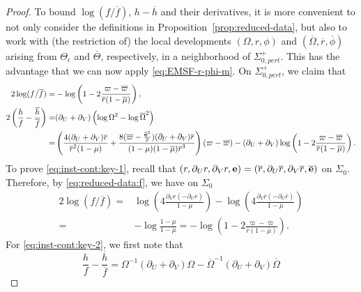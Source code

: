 \documentclass[10pt, reqno]{amsart}
\theoremstyle{definition}
\theoremstyle{remark}
\theoremstyle{conjecture}
\numberwithin{equation}{section}
\newcommand{\rd}{\partial}
\newcommand{\0}{\emptyset}
\newcommand{\eps}{\epsilon}
\newcommand{\Sgm}{\Sigma}
\newcommand{\Tht}{\Theta}
\newcommand{\Omg}{\Omega}
\newcommand{\bfe}{{\bf e}}
\newcommand{\f}{\frac}
\newcommand{\e}{\bfe}							%
\newcommand{\Omgbg}{\overline{\Omg}}				%
\newcommand{\phibg}{\overline{\phi}}				%
\newcommand{\rbg}{\overline{r}}					%
\newcommand{\varpibg}{\overline{\varpi}}				%
\newcommand{\mubg}{\overline{\mu}}				%
\newcommand{\ebg}{\overline{\e}}					%
\newcommand{\fbg}{\overline{f}}
\newcommand{\hbg}{\overline{h}}
\newcommand{\ellbg}{\overline{\ell}}
\begin{document}
\begin{proof}
To bound $\log(f/\fbg)$, $h - \hbg$ and their derivatives, it is more convenient to not only consider the definitions in Proposition~\ref{prop:reduced-data}, but also to work with (the restriction of) the local developments $(\Omg, r, \phi)$ and $(\Omgbg, \rbg, \phibg)$ arising from $\Tht_{\eps}$ and $\overline{\Tht}$, respectively, in a neighborhood of $\Sgm_{0, pert}^{+}$. This has the advantage that we can now apply \eqref{eq:EMSF-r-phi-m}. On $\Sgm_{0, pert}^{+}$, we claim that
\begin{align}
	2 \log (f / \fbg)
	= & - \log \left( 1 - 2 \frac{\varpi - \varpibg}{\rbg (1-\mubg)} \right) , \label{eq:inst-cont:key-1} \\
	2 \left(\f{h}{f} - \f{\hbg}{\fbg}\right)
	= & (\rd_{U} + \rd_{V}) \left(\log \Omg^{2} - \log \Omgbg^{2}\right) \notag \\
	= & \left( \frac{4 (\rd_{U} + \rd_{V}) \rbg}{\rbg^{2} (1-\mu)} + \frac{8 (\varpibg - \frac{\ebg^{2}}{\rbg}) (\rd_{U} + \rd_{V}) \rbg}{(1-\mu) (1-\mubg) \rbg^{3}} \right) (\varpi - \varpibg)
	-  (\rd_{U} + \rd_{V}) \log \left( 1 - 2 \frac{\varpi - \varpibg}{\rbg (1-\mubg)} \right). \label{eq:inst-cont:key-2} %
\end{align}
To prove \eqref{eq:inst-cont:key-1}, recall that $(r, \rd_{U} r, \rd_{V} r, \e) = (\rbg, \rd_{U} \rbg, \rd_{V} \rbg, \ebg)$ on $\Sgm_{0}$. Therefore, by \eqref{eq:reduced-data:f}, we have on $\Sgm_{0}$
\begin{align*}
	2 \log(f / \fbg)
	= &\log \left(4 \frac{\rd_{V} r (- \rd_{U} r)}{1-\mu} \right) - \log \left(4 \frac{\rd_{V} \rbg (- \rd_{U} \rbg)}{1-\mubg} \right) \\
	= & - \log \frac{1 - \mu}{1 - \mubg} 
	=- \log \left(1 - 2 \frac{\varpi - \varpibg}{\rbg (1 - \mubg)}  \right) .
\end{align*}
For \eqref{eq:inst-cont:key-2}, we first note that
\begin{equation*}
	\f{h}{f} - \f{\hbg}{\fbg}
	= \Omg^{-1} (\rd_{U} + \rd_{V}) \Omg - \Omgbg^{-1} (\rd_{U} + \rd_{V}) \Omgbg

\end{equation*}
\end{proof}
\end{document}
